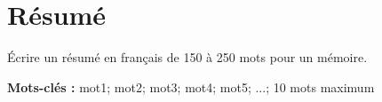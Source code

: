 \chapter*{Résumé}

Écrire un résumé en français de 150 à 250 mots pour un mémoire.

\noindent\textbf{Mots-clés :} mot1; mot2; mot3; mot4; mot5; ...; 10 mots maximum
\newpage



